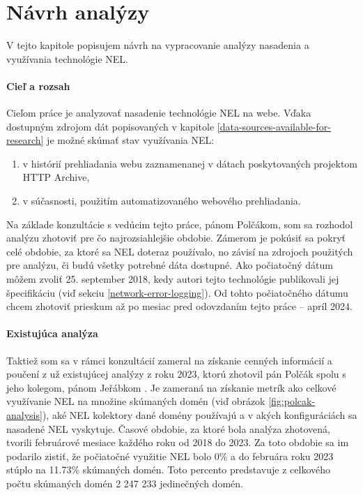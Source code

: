 \chapter{Návrh analýzy}
\label{possible-analysis-strategies}

V tejto kapitole popisujem návrh na vypracovanie analýzy nasadenia a využívania technológie NEL.

\subsubsection{Cieľ a rozsah}

Cieľom práce je analyzovať nasadenie technológie NEL na webe. 
Vďaka dostupným zdrojom dát popisovaných v kapitole \ref{data-sources-available-for-research} je možné skúmať stav využívania NEL:
\begin{enumerate}
    \item v histórií prehliadania webu zaznamenanej v dátach poskytovaných projektom HTTP Archive,
    \item v súčasnosti, použitím automatizovaného webového prehliadania.
\end{enumerate}

Na základe konzultácie s vedúcim tejto práce, pánom Polčákom, som sa rozhodol analýzu zhotoviť pre čo 
najrozsiahlejšie obdobie.
Zámerom je pokúsiť sa pokryť celé obdobie, za ktoré sa NEL doteraz používalo, no závisí na zdrojoch použitých pre analýzu, či budú všetky potrebné dáta dostupné.
Ako počiatočný dátum môžem zvoliť 25. september 2018, kedy autori tejto technológie publikovali jej špecifikáciu (viď sekciu \ref{network-error-logging}).
Od tohto počiatočného dátumu chcem zhotoviť prieskum až po mesiac pred odovzdaním tejto práce -- apríl 2024.

\subsubsection{Existujúca analýza}

Taktiež som sa v rámci konzultácií zameral na získanie cenných informácií a poučení z už existujúcej analýzy z roku 2023,
ktorú zhotovil pán Polčák spolu s jeho kolegom, pánom Jeřábkom \cite{nel-http-archive}.
Je zameraná na získanie metrík ako celkové využívanie NEL na množine skúmaných domén (viď obrázok \ref{fig:polcak-analysis}), aké NEL kolektory dané domény používajú a v akých konfiguráciách sa nasadené NEL vyskytuje.
Časové obdobie, za ktoré bola analýza zhotovená, tvorili februárové mesiace každého roku od 2018 do 2023. 
Za toto obdobie sa im podarilo zistiť, že počiatočné využitie NEL bolo 0\% a do februára roku 2023 stúplo na 11.73\% skúmaných domén.
Toto percento predstavuje z celkového počtu skúmaných domén 2 247 233 jedinečných domén.

